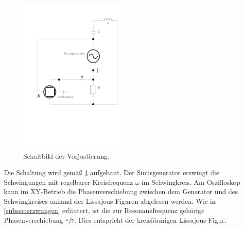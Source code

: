 \begin{figure}
    \centering
    \includegraphics[width=0.5\textwidth]{plots/gekop_schw_kreis2.pdf}
    \caption{Schaltbild der Vorjustierung.}
    \label{fig:vorbereitung}
\end{figure}
Die Schaltung wird gemäß \ref{fig:vorbereitung} aufgebaut. 
Der Sinusgenerator erzwingt die Schwingungen mit regelbarer Kreisfrequenz $\omega$ im Schwingkreis. 
Am Oszilloskop kann im XY-Betrieb die Phasenverschiebung zwischen dem Generator und des Schwingkreises anhand 
der Lissajous-Figuren abgelesen werden. 
Wie in \ref{subsec:erzwungen} erläutert, ist die zur Resonanzfrequenz gehörige Phasenverschiebung $\sfrac{\pi}{2}$.
Dies entspricht der kreisförmigen Lissajous-Figur. 

